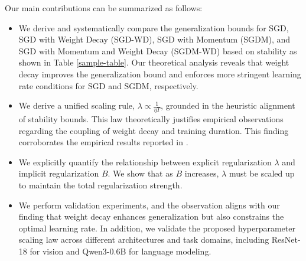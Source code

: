 Our main contributions can be summarized as follows:
\begin{itemize}
    \item We derive and systematically compare the generalization bounds for SGD, SGD with Weight Decay (SGD-WD), SGD with Momentum (SGDM), and SGD with Momentum and Weight Decay (SGDM-WD) based on stability as shown in Table \ref{sample-table}. Our theoretical analysis reveals that weight decay improves the generalization bound and enforces more stringent learning rate conditions for SGD and SGDM, respectively. %
    \item We derive a unified scaling rule, $\lambda \propto \frac{1}{\eta T}$, grounded in the heuristic alignment of stability bounds. This law theoretically justifies empirical observations regarding the coupling of weight decay and training duration. This finding corroborates the empirical results reported in \cite{wang2025setadamwsweightdecay}.
    \item We explicitly quantify the relationship between explicit regularization $\lambda$ and implicit regularization $B$. We show that as $B$ increases, $\lambda$ must be scaled up to maintain the total regularization strength. 
    \item We perform validation experiments, and the observation aligns with our finding that weight decay enhances generalization but also constrains the optimal learning rate. In addition, we validate the proposed hyperparameter scaling law across different architectures and task domains, including ResNet-18 for vision and Qwen3-0.6B for language modeling.
\end{itemize}
